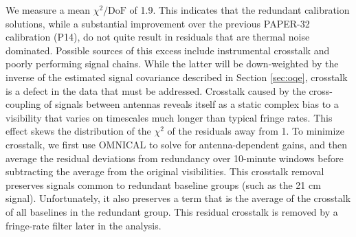 \documentclass[twocolumn,numberedappendix]{emulateapj} \shorttitle{New Limits on the 21 cm Power Spectrum at $z=8.4$}
\begin{document}
We measure a mean $\chi^{2}/\text{DoF}$ of 1.9.  This
indicates that the redundant calibration solutions, while a substantial improvement
over the previous PAPER-32 calibration (P14), do not quite result in residuals that are thermal noise dominated.
Possible sources of this excess include instrumental crosstalk and poorly performing signal chains.
While the latter will be down-weighted by the inverse of the estimated signal covariance described
in Section \ref{sec:oqe}, crosstalk is a defect in the data that must be addressed.
Crosstalk caused by the cross-coupling of signals between antennas
reveals itself as a static complex bias to a
visibility that varies on timescales much longer than typical fringe rates.
This effect 
skews the distribution of the $\chi^2$ of the residuals away from 1.
To minimize crosstalk, we first use OMNICAL to solve for antenna-dependent gains,
and then average the residual deviations from redundancy
over 10-minute windows before subtracting
the average from the original visibilities. This
crosstalk removal preserves signals common to redundant baseline groups (such as the 21 cm signal).
Unfortunately, it also preserves a term that is the average of the crosstalk of all baselines
in the redundant group.  This residual crosstalk is removed by a fringe-rate filter later
in the analysis.
\end{document}
